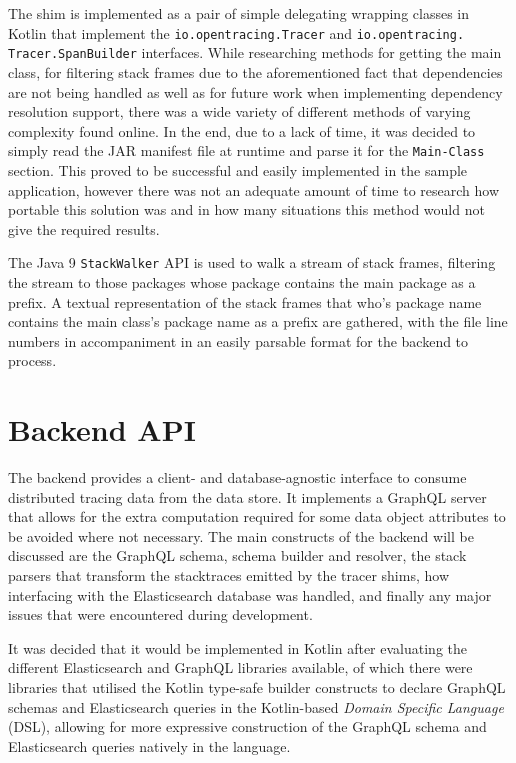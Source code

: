 \documentclass[12pt,pdftex,titlepage]{report}
\begin{document}
                The shim is implemented as a pair of simple delegating wrapping classes in Kotlin that implement the \texttt{io.opentracing.Tracer} and \texttt{io.opentracing.\\Tracer.SpanBuilder} interfaces. While
                researching methods for getting the main class, for filtering stack frames due to the aforementioned fact that dependencies are not being handled as well as for future work when implementing dependency 
                resolution support, there was a wide variety of different methods of varying complexity found online. In the end, due to a lack of time, it was decided to simply read the JAR manifest file at runtime
                and parse it for the \texttt{Main-Class} section. This proved to be successful and easily implemented in the sample application, however there was not an adequate amount of time to research how portable
                this solution was and in how many situations this method would not give the required results.

                The Java 9 \texttt{StackWalker}\cite{stackwalker} API is used to walk a stream of stack frames, filtering the stream to those packages whose package contains the main package as a prefix. A textual
                representation of the stack frames that who's package name contains the main class's package name as a prefix are gathered, with the file line numbers in accompaniment in an easily parsable format for 
                the backend to process.
            
        \section{Backend API}
        \label{sec:backend}
            The backend provides a client- and database-agnostic interface to consume distributed tracing data from the data store. It implements a GraphQL server that allows for the extra computation
            required for some data object attributes to be avoided where not necessary. The main constructs of the backend will be discussed are the GraphQL schema, schema builder and resolver, the stack
            parsers that transform the stacktraces emitted by the tracer shims, how interfacing with the Elasticsearch database was handled, and finally any major issues that were encountered during development.

            It was decided that it would be implemented in Kotlin after evaluating the different Elasticsearch and GraphQL libraries available, of which there were libraries 
            that utilised the Kotlin type-safe builder constructs\cite{dsl} to declare GraphQL schemas and Elasticsearch queries in the Kotlin-based \textit{Domain Specific Language} (DSL), allowing
            for more expressive construction of the GraphQL schema and Elasticsearch queries natively in the language. 
            
\end{document}
